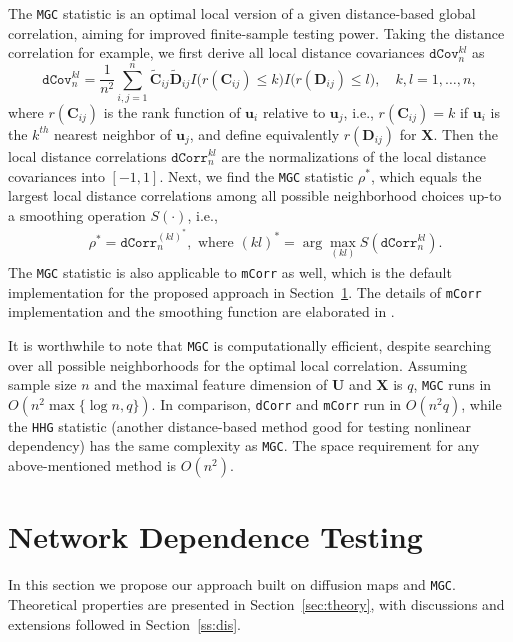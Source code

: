 \documentclass[11pt]{article}
\theoremstyle{definition}
\begin{document}
The \texttt{MGC} statistic is an optimal local version of a given distance-based global correlation, aiming for improved finite-sample testing power. Taking the distance correlation for example, we first derive all local distance covariances $\texttt{dCov}^{kl}_{n}$ as 
\begin{equation}
\label{eq:MGC}
\texttt{dCov}^{kl}_{n} = \frac{1}{n^2} \sum\limits_{i,j=1}^{n} \tilde{\mathbf{C}}_{ij} \tilde{\mathbf{D}}_{ij} I\big( r(\mathbf{C}_{ij}) \leq k \big) I\big(  r(\mathbf{D}_{ij}) \leq l  \big), \quad k,l= 1, \ldots, n,
\end{equation}
where $r(\mathbf{C}_{ij})$ is the rank function of $\mathbf{u}_{i}$ relative to $\mathbf{u}_{j}$, i.e., $r(\mathbf{C}_{ij})=k$ if $\mathbf{u}_{i}$ is the $k^{th}$ nearest neighbor of $\mathbf{u}_{j}$, and define equivalently $r(\mathbf{D}_{ij})$ for $\mathbf{X}$. Then the local distance correlations $\texttt{dCorr}_{n}^{kl}$ are the normalizations of the local distance covariances into $[-1,1]$. Next, we find the \texttt{MGC} statistic $\rho^{*}$, which equals the largest local distance correlations among all possible neighborhood choices up-to a smoothing operation $S(\cdot)$, i.e.,
\begin{align}
\label{eq:MGC2}
& \rho^{*}=\texttt{dCorr}_{n}^{(kl)^{*}}, \mbox{ where } (kl)^{*}=\arg\max_{(kl)}S(\texttt{dCorr}_{n}^{kl}).
\end{align}
The \texttt{MGC} statistic is also applicable to \texttt{mCorr} as well, which is the default implementation for the proposed approach in Section~\ref{sec:method}. The details of \texttt{mCorr} implementation and the smoothing function are elaborated in \cite{shen2016discovering}.  

It is worthwhile to note that \texttt{MGC} is computationally efficient, despite searching over all possible neighborhoods for the optimal local correlation. Assuming sample size $n$ and the maximal feature dimension of $\mathbf{U}$ and $\mathbf{X}$ is $q$, \texttt{MGC} runs in $O(n^2 \max\{\log n,q\})$. In comparison, \texttt{dCorr} and \texttt{mCorr} run in $O(n^2 q)$, while the \texttt{HHG} statistic (another distance-based method good for testing nonlinear dependency) has the same complexity as \texttt{MGC}. The space requirement for any above-mentioned method is $O(n^2)$.

\section{Network Dependence Testing}
\label{sec:method}
In this section we propose our approach built on diffusion maps and \texttt{MGC}. Theoretical properties are presented in Section~\ref{sec:theory}, with discussions and extensions followed in Section~\ref{ss:dis}.
\end{document}
